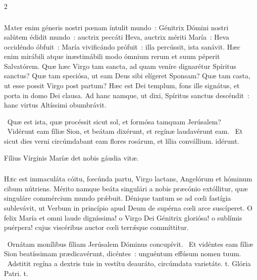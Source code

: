 \documentclass[9pt,twoside]{extarticle}
\begin{document}
\begin{multicols}{2}
\subsubsection*{\center {}}
\lettrine{M}ater enim géneris nostri pœnam íntulit mundo~: Génitrix Dómini nostri salútem édidit mundo~: auctrix peccáti Heva, auctrix mériti María~: Heva occidéndo óbfuit~: María vivificándo prófuit~: illa percússit, ista sanávit. Hæc enim mirábili atque inæstimábili modo ómnium rerum et suum péperit Salvatórem. Quæ hæc Virgo tam sancta, ad quam veníre dignarétur Spíritus sanctus? Quæ tam speciósa, ut eam Deus sibi elígeret Sponsam? Quæ tam casta, ut esse possit Virgo post partum? Hæc est Dei templum, fons ille signátus, et porta in domo Dei clausa. Ad hanc namque, ut dixi, Spíritus sanctus descéndit~: hanc virtus Altíssimi obumbrávit.

\begin{tightlist}{}
\item {}~Quæ est ista, quæ procéssit sicut sol, et formósa tamquam Jerúsalem? \textred{*}~Vidérunt eam fíliæ Sion, et beátam dixérunt, et regínæ laudavérunt eam.
~Et sicut dies verni circúmdabant eam flores rosárum, et lília convállium. idérunt.
\item {\small {} Fílius Vírginis Maríæ det nobis gáudia vitæ.}
\end{tightlist}

\subsubsection*{\center {}}
\lettrine{H}æc est immaculáta cóitu, fœcúnda partu, Virgo lactans, Angelórum et hóminum cibum nútriens. Mérito namque beáta singulári a nobis præcónio extóllitur, quæ singuláre commércium mundo prǽbuit. Dénique tantum se ad cœli fastígia sublevávit, ut Verbum in princípio apud Deum de supérna cœli arce suscíperet. O felix María et omni laude digníssima! o Virgo Dei Génitrix gloriósa! o sublímis puérpera! cujus viscéribus auctor cœli terrǽque commíttitur.

\begin{tightlist}{}
\item {}~Ornátam monílibus fíliam Jerúsalem Dóminus concupívit. \textred{*}~Et vidéntes eam fíliæ Sion beatíssimam prædicavérunt, dicéntes~: unguéntum effúsum nomen tuum.
~Adstitit regína a dextris tuis in vestítu deauráto, circúmdata varietáte. t. Glória Patri. t.
\end{tightlist}


\end{multicols}
\end{document}
